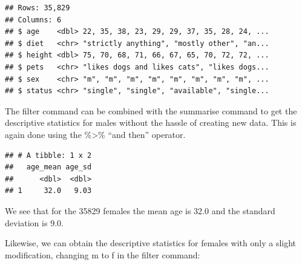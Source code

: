 \documentclass[
]{krantz}
\makeatletter
\newenvironment{Shaded}{\begin{snugshade}}{\end{snugshade}}
\newcommand{\DataTypeTok}[1]{\textcolor[rgb]{0.27,0.27,0.27}{#1}}
\newcommand{\KeywordTok}[1]{\textcolor[rgb]{0.27,0.27,0.27}{\textbf{#1}}}
\newcommand{\NormalTok}[1]{#1}
\newcommand{\OperatorTok}[1]{\textcolor[rgb]{0.43,0.43,0.43}{\textbf{#1}}}
\newcommand{\OtherTok}[1]{\textcolor[rgb]{0.37,0.37,0.37}{#1}}
\newcommand{\StringTok}[1]{\textcolor[rgb]{0.5,0.5,0.5}{#1}}
\newenvironment{kframe}{%
\medskip{}
\setlength{\fboxsep}{.8em}
 \def\at@end@of@kframe{}%
 \ifinner\ifhmode%
  \def\at@end@of@kframe{\end{minipage}}%
  \begin{minipage}{\columnwidth}%
 \fi\fi%
 \def\FrameCommand##1{\hskip\@totalleftmargin \hskip-\fboxsep
 \colorbox{shadecolor}{##1}\hskip-\fboxsep
     \hskip-\linewidth \hskip-\@totalleftmargin \hskip\columnwidth}%
 \MakeFramed {\advance\hsize-\width
   \@totalleftmargin\z@ \linewidth\hsize
   \@setminipage}}%
 {\par\unskip\endMakeFramed%
 \at@end@of@kframe}
\renewenvironment{Shaded}{\begin{kframe}}{\end{kframe}}
\makeatother
\begin{document}
\begin{verbatim}
## Rows: 35,829
## Columns: 6
## $ age    <dbl> 22, 35, 38, 23, 29, 29, 37, 35, 28, 24, ...
## $ diet   <chr> "strictly anything", "mostly other", "an...
## $ height <dbl> 75, 70, 68, 71, 66, 67, 65, 70, 72, 72, ...
## $ pets   <chr> "likes dogs and likes cats", "likes dogs...
## $ sex    <chr> "m", "m", "m", "m", "m", "m", "m", "m", ...
## $ status <chr> "single", "single", "available", "single...
\end{verbatim}

The filter command can be combined with the summarise command to get the descriptive statistics for males without the hassle of creating new data. This is again done using the \%\textgreater\% ``and then'' operator.

\begin{Shaded}
\end{Shaded}

\begin{verbatim}
## # A tibble: 1 x 2
##   age_mean age_sd
##      <dbl>  <dbl>
## 1     32.0   9.03
\end{verbatim}

We see that for the 35829 females the mean age is 32.0 and the standard deviation is 9.0.

Likewise, we can obtain the descriptive statistics for females with only a slight modification, changing m to f in the filter command:

\begin{Shaded}
\end{Shaded}
\end{document}
